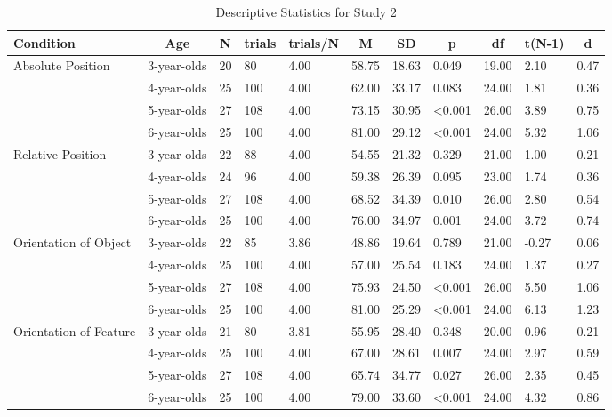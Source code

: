 \documentclass[
  man]{apa6}
\begin{document}
\begin{table}[tbp]

\begin{center}
\begin{threeparttable}

\caption{\label{tab:s2_testtables}Descriptive Statistics for Study 2}

\scriptsize{

\begin{tabular}{lllllllllll}
\toprule
Condition & \multicolumn{1}{c}{Age} & \multicolumn{1}{c}{N} & \multicolumn{1}{c}{trials} & \multicolumn{1}{c}{trials/N} & \multicolumn{1}{c}{M} & \multicolumn{1}{c}{SD} & \multicolumn{1}{c}{p} & \multicolumn{1}{c}{df} & \multicolumn{1}{c}{t(N-1)} & \multicolumn{1}{c}{d}\\
\midrule
Absolute Position & 3-year-olds & 20 & 80 & 4.00 & 58.75 & 18.63 & 0.049 & 19.00 & 2.10 & 0.47\\
 & 4-year-olds & 25 & 100 & 4.00 & 62.00 & 33.17 & 0.083 & 24.00 & 1.81 & 0.36\\
 & 5-year-olds & 27 & 108 & 4.00 & 73.15 & 30.95 & <0.001 & 26.00 & 3.89 & 0.75\\
 & 6-year-olds & 25 & 100 & 4.00 & 81.00 & 29.12 & <0.001 & 24.00 & 5.32 & 1.06\\
Relative Position & 3-year-olds & 22 & 88 & 4.00 & 54.55 & 21.32 & 0.329 & 21.00 & 1.00 & 0.21\\
 & 4-year-olds & 24 & 96 & 4.00 & 59.38 & 26.39 & 0.095 & 23.00 & 1.74 & 0.36\\
 & 5-year-olds & 27 & 108 & 4.00 & 68.52 & 34.39 & 0.010 & 26.00 & 2.80 & 0.54\\
 & 6-year-olds & 25 & 100 & 4.00 & 76.00 & 34.97 & 0.001 & 24.00 & 3.72 & 0.74\\
Orientation of Object & 3-year-olds & 22 & 85 & 3.86 & 48.86 & 19.64 & 0.789 & 21.00 & -0.27 & 0.06\\
 & 4-year-olds & 25 & 100 & 4.00 & 57.00 & 25.54 & 0.183 & 24.00 & 1.37 & 0.27\\
 & 5-year-olds & 27 & 108 & 4.00 & 75.93 & 24.50 & <0.001 & 26.00 & 5.50 & 1.06\\
 & 6-year-olds & 25 & 100 & 4.00 & 81.00 & 25.29 & <0.001 & 24.00 & 6.13 & 1.23\\
Orientation of Feature & 3-year-olds & 21 & 80 & 3.81 & 55.95 & 28.40 & 0.348 & 20.00 & 0.96 & 0.21\\
 & 4-year-olds & 25 & 100 & 4.00 & 67.00 & 28.61 & 0.007 & 24.00 & 2.97 & 0.59\\
 & 5-year-olds & 27 & 108 & 4.00 & 65.74 & 34.77 & 0.027 & 26.00 & 2.35 & 0.45\\
 & 6-year-olds & 25 & 100 & 4.00 & 79.00 & 33.60 & <0.001 & 24.00 & 4.32 & 0.86\\
\bottomrule
\end{tabular}

}

\end{threeparttable}
\end{center}

\end{table}
\end{document}
